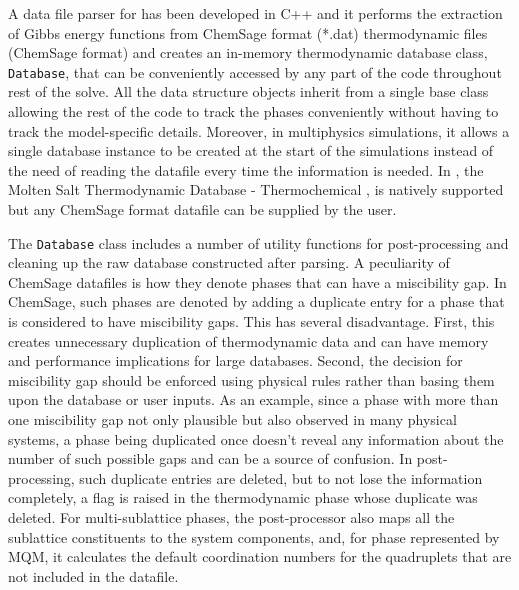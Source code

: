 	A data file parser for {\GEM} has been developed in C++ and it performs the extraction of Gibbs energy functions from ChemSage format (*.dat) thermodynamic files (ChemSage format) and creates an in-memory thermodynamic database class, \texttt{Database}, that can be conveniently accessed by any part of the code throughout rest of the solve. All the data structure objects inherit from a single base class allowing the rest of the code to track the phases conveniently without having to track the model-specific  details. Moreover, in multiphysics simulations, it allows a single database instance to be created at the start of the simulations instead of the need of reading the datafile every time the information is needed. In {\GEM}, the Molten Salt Thermodynamic Database - Thermochemical \cite{Besmann:2021aa,Ard:2022aa}, is natively supported but any ChemSage format datafile can be supplied by the user.
	
	The \texttt{Database} class includes a number of utility functions for post-processing and cleaning up the raw database constructed after parsing. A peculiarity of ChemSage datafiles is how they denote phases that can have a miscibility gap. In ChemSage, such phases are denoted by adding a duplicate entry for a phase that is considered to have miscibility gaps. This has several disadvantage. First, this creates unnecessary duplication of thermodynamic data and can have memory and performance implications for large databases. Second, the decision for miscibility gap should be enforced using physical rules rather than basing them upon the database or user inputs. As an example, since a phase with more than one miscibility gap not only plausible but also observed in many physical systems, a phase being duplicated once doesn't reveal any information about the number of such possible gaps and can be a source of confusion. In post-processing, such duplicate entries are deleted, but to not lose the information completely, a flag is raised in the thermodynamic phase whose duplicate was deleted. For multi-sublattice phases, the post-processor also maps all the sublattice constituents to the system components, and, for phase represented by MQM, it calculates the default coordination numbers for the quadruplets that are not included in the datafile.
	
